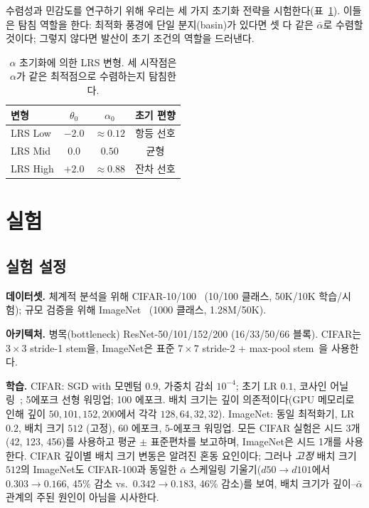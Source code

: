 \documentclass{bmvc2k}
\begin{document}
수렴성과 민감도를 연구하기 위해 우리는 세 가지 초기화 전략을 시험한다(표~\ref{tab:init_variants}). 이들은 탐침 역할을 한다: 최적화 풍경에 단일 분지(basin)가 있다면 셋 다 같은 $\bar{\alpha}$로 수렴할 것이다; 그렇지 않다면 발산이 초기 조건의 역할을 드러낸다.

\begin{table}[!ht]
\centering
\small
\caption{$\alpha$ 초기화에 의한 LRS 변형. 세 시작점은 $\alpha$가 같은 최적점으로 수렴하는지 탐침한다.}
\label{tab:init_variants}
\begin{tabular}{lccc}
\toprule
\textbf{변형} & $\theta_0$ & $\alpha_0$ & \textbf{초기 편향} \\
\midrule
LRS Low  & $-2.0$ & $\approx 0.12$ & 항등 선호 \\
LRS Mid  & $0.0$  & $0.50$         & 균형 \\
LRS High & $+2.0$ & $\approx 0.88$ & 잔차 선호 \\
\bottomrule
\end{tabular}
\end{table}

\section{실험}
\label{sec:experiments}

\subsection{실험 설정}
\label{sec:setup}

\textbf{데이터셋.} 체계적 분석을 위해 CIFAR-10/100~\cite{krizhevsky2009learning} (10/100 클래스, 50K/10K 학습/시험); 규모 검증을 위해 ImageNet~\cite{russakovsky2015imagenet} (1000 클래스, 1.28M/50K).

\textbf{아키텍처.} 병목(bottleneck) ResNet-50/101/152/200 (16/33/50/66 블록). CIFAR는 $3{\times}3$ stride-1 stem을, ImageNet은 표준 $7{\times}7$ stride-2 + max-pool stem~\cite{he2016deep}을 사용한다.

\textbf{학습.} CIFAR: SGD with 모멘텀 0.9, 가중치 감쇠 $10^{-4}$; 초기 LR $0.1$, 코사인 어닐링~\cite{loshchilov2017sgdr}; 5에포크 선형 워밍업; 100 에포크. 배치 크기는 깊이 의존적이다(GPU 메모리로 인해 깊이 $50, 101, 152, 200$에서 각각 $128, 64, 32, 32$). ImageNet: 동일 최적화기, LR $0.2$, 배치 크기 $512$ (고정), $60$ 에포크, $5$-에포크 워밍업. 모든 CIFAR 실험은 시드 3개 (42, 123, 456)를 사용하고 평균 $\pm$ 표준편차를 보고하며, ImageNet은 시드 1개를 사용한다. CIFAR 깊이별 배치 크기 변동은 알려진 혼동 요인이다; 그러나 \emph{고정} 배치 크기 $512$의 ImageNet도 CIFAR-100과 동일한 $\bar{\alpha}$ 스케일링 기울기($d50 \to d101$에서 $0.303 \to 0.166$, 45\% 감소 vs.\ $0.342 \to 0.183$, 46\% 감소)를 보여, 배치 크기가 깊이--$\bar{\alpha}$ 관계의 주된 원인이 아님을 시사한다.
\end{document}
